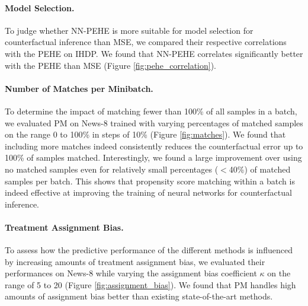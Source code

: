 \documentclass{article}
\begin{document}
\paragraph{Model Selection.} To judge whether NN-PEHE is more suitable for model selection for counterfactual inference than MSE, we compared their respective correlations with the PEHE on IHDP. We found that NN-PEHE correlates significantly better with the PEHE than MSE (Figure \ref{fig:pehe_correlation}).

\paragraph{Number of Matches per Minibatch.} To determine the impact of matching fewer than 100\% of all samples in a batch, we evaluated PM on News-8 trained with varying percentages of matched samples on the range 0 to 100\% in steps of 10\% (Figure \ref{fig:matches}). We found that including more matches indeed consistently reduces the counterfactual error up to 100\% of samples matched. Interestingly, we found a large improvement over using no matched samples even for relatively small percentages ($<$40\%) of matched samples per batch. This shows that propensity score matching within a batch is indeed  effective at improving the training of neural networks for counterfactual inference.

\paragraph{Treatment Assignment Bias.} To assess how the predictive performance of the different methods is influenced by increasing amounts of treatment assignment bias, we evaluated their performances on News-8 while varying the assignment bias coefficient $\kappa$ on the range of 5 to 20 (Figure \ref{fig:assignment_bias}). We found that PM handles high amounts of assignment bias better than existing state-of-the-art methods.
\end{document}
